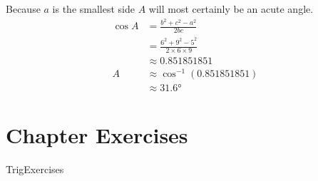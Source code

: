 Because $a$ is the smallest side $A$ will most certainly be an acute angle.
\begin{align*}\cos  A &  = \frac{b^{2} +c^{2} -a^{2}}{2 b c} \\
&  = \frac{6^{2} +9^{2} -5^{2}}{2 \times 6 \times 9} \\
&  \approx 0.851851851 \\
A &  \approx \cos ^{ -1} \left (0.851851851\right ) \\
&  \approx \ang{31.6} 
\end{align*}

\section{Chapter Exercises}
{TrigExercises}

